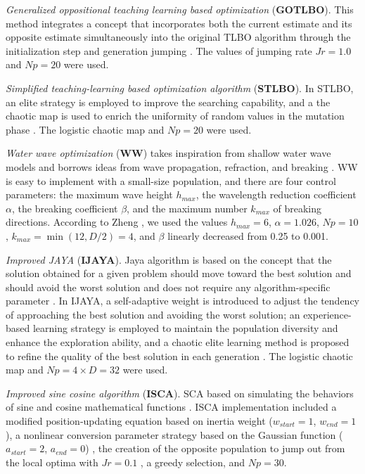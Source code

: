 \documentclass[a4paper,fleqn]{cas-sc}
\begin{document}
\emph{Generalized oppositional teaching learning based optimization} (\textbf{GOTLBO}).
This method integrates a concept that incorporates both the current estimate
and its opposite estimate simultaneously into the original TLBO algorithm
through the initialization step and generation jumping \cite{GOTLBO}.
The values of jumping rate $J\!r=1.0$ and $N\!p=20$ were used.

\emph{Simplified teaching-learning based optimization algorithm} (\textbf{STLBO}).
In STLBO, an elite strategy is employed to improve the searching capability,
and a the chaotic map is used to enrich the uniformity of random values in the mutation phase \cite{STLBO}.
The logistic chaotic map and $N\!p=20$ were used.


\emph{Water wave optimization} (\textbf{WW}) takes inspiration from shallow water wave models
and borrows ideas from wave propagation, refraction, and breaking \cite{WW}.
WW is easy to implement with a small-size population, and there are four control parameters:
the maximum wave height $h_{max}$,
the wavelength reduction coefficient $\alpha$,
the breaking coefficient $\beta$,
and the maximum number $k_{max}$ of breaking directions.
According to Zheng \cite{WW}, we used
the values $h_{max}=6$, $\alpha=1.026$,  $N\!p=10$,
$k_{max}=\min(12,D/2)=4$, and $\beta$ linearly decreased from 0.25 to 0.001.

\emph{Improved JAYA} (\textbf{IJAYA}).
Jaya algorithm is based on the concept
that the solution obtained for a given problem should move toward the best solution and should
avoid the worst solution and does not require any algorithm-specific parameter \cite{JAYA}.
In IJAYA, a self-adaptive weight is introduced to adjust the tendency of approaching the best solution
and avoiding the worst solution;
an experience-based learning strategy is employed to maintain the population diversity and enhance the exploration ability,
and a chaotic elite learning method is proposed to refine the quality of the best solution in each generation \cite{IJAYA}.
The logistic chaotic map and $N\!p=4\times D=32$ were used.

\emph{Improved sine cosine algorithm} (\textbf{ISCA}).
SCA based on simulating the behaviors of sine and cosine mathematical functions \cite{SCA}.
ISCA implementation included a modified position-updating equation based on inertia weight
($w_{start}=1$, $w_{end}=1$),
a nonlinear conversion parameter strategy based on the Gaussian function
($a_{start}=2$, $a_{end}=0$) \cite{ISCA2},
the creation of the opposite population to jump out from the local optima with $J\!r=0.1$ \cite{ISCA3},
a greedy selection, and $N\!p=30$.
\end{document}

